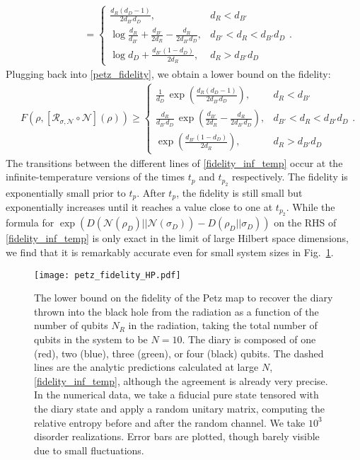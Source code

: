 \documentclass[a4paper,11pt]{article}
\begin{document}
\begin{enumerate}
\begin{align}
 &= \begin{cases}
 \frac{d_R(d_D-1)}{2d_{B'}d_D} , & d_R < d_{B'}
 \\
 \log \frac{d_R}{d_{B'}}+\frac{d_{B'}}{2 d_R} -\frac{d_{R}}{2 d_{B'}d_D} , & d_{B'}<d_R < d_{B'}d_D
 \\
 \log d_D+\frac{d_{B'}(1-d_D)}{2d_R}, & d_R >d_{B'}d_D
 \end{cases}.
 \label{Srel_HP_eq}
\end{align}
Plugging back into \eqref{petz_fidelity}, we obtain a lower bound on the fidelity: 
\begin{align}
 &F(\rho, [\mathcal{R}_{\sigma,\mathcal{N}}\circ \mathcal{N}](\rho)) \geq \begin{cases}
 \frac{1}{d_D}\, {\exp\left({\frac{d_R(d_D-1)}{2d_{B'}d_D}}\right)}, & d_R < d_{B'}
 \\
 \frac{d_R}{d_{B'}d_D}\, \exp\left({\frac{d_{B'}}{2 d_R} -\frac{d_{R}}{2 d_{B'}d_D}}\right) , & d_{B'}<d_R < d_{B'}d_D
 \\
 \exp\left({\frac{d_{B'}(1-d_D)}{2d_R}}\right), & d_R > d_{B'}d_D
 \end{cases}.
 \label{fidelity_inf_temp}
\end{align}
The transitions between the different lines of \eqref{fidelity_inf_temp} occur at the infinite-temperature versions of the times $t_{p}$ and $t_{p_2}$ respectively.
The fidelity is exponentially small prior to $t_p$. After $t_p$, the fidelity is still small but exponentially increases until it reaches a value close to one at $t_{p_2}$.
While the formula for $\exp (D(\mathcal{N}(\rho_D) || 
 \mathcal{N}(\sigma_D) ) - D(\rho_D|| \sigma_D) )$ on the RHS of \eqref{fidelity_inf_temp} is only exact in the limit of large Hilbert space dimensions, we find that it is remarkably accurate even for small system sizes in Fig.~\ref{petz_fidelity_HP}.
\begin{figure}
 \centering
 \texttt{[image: petz\_fidelity\_HP.pdf]}
 \caption{The lower bound on the fidelity of the Petz map to recover the diary thrown into the black hole from the radiation as a function of the number of qubits $N_R$ in the radiation, taking the total number of qubits in the system to be $N=10$. The diary is composed of one (red), two (blue), three (green), or four (black) qubits. The dashed lines are the analytic predictions calculated at large $N$, \eqref{fidelity_inf_temp}, although the agreement is already very precise. In the numerical data, we take a fiducial pure state tensored with the diary state and apply a random unitary matrix, computing the relative entropy before and after the random channel. We take $10^3$ disorder realizations. Error bars are plotted, though barely visible due to small fluctuations.
} 
 \label{petz_fidelity_HP}
\end{figure}




\end{enumerate}
\end{document}
